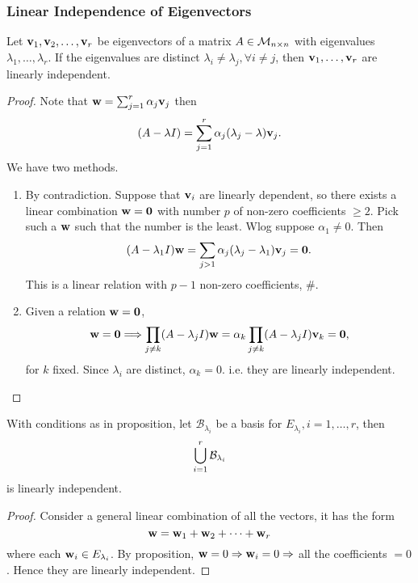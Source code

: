 \documentclass[10pt]{article}
\def\ge{\geqslant}
\begin{document}
    \subsubsection{Linear Independence of Eigenvectors}
    \begin{proposition}\label{prop:eigenvectors linearly independent}
        Let $ {\bf v}_1,{\bf v}_2,\dots, {\bf v}_r $ be eigenvectors of a matrix $A\in {\mathcal{M}}_{n\times n}$ with eigenvalues $ \lambda_1,\dots,\lambda_r $. If the eigenvalues are distinct $ \lambda_i\neq \lambda_j, \forall i\neq j $, then $ {\bf v}_1,\dots,{\bf v}_r $ are linearly independent.
    \end{proposition}
    \begin{proof}
        Note that $ {\bf w}=\sum_{j=1}^{r} \alpha_j {\bf v}_j $ then 
        \[
            (A-\lambda I)=\sum_{j=1}^{r} \alpha_j(\lambda_j-\lambda){\bf v}_j
        .\]
        We have two methods.
        \begin{enumerate}[align=hang,label=Method \arabic*.]
            \item By contradiction. Suppose that ${\bf v}_i$ are linearly dependent, so there exists a linear combination $ {\bf w}= \mathbf{0} $ with number $p$ of non-zero coefficients $ \ge 2 $. Pick such a ${\bf w}$ such that the number is the least. Wlog suppose $ \alpha_1 \neq 0$. Then 
            \[
                (A-\lambda_1 I){\bf w}= \sum_{j>1}\alpha_j(\lambda_j-\lambda_1 ){\bf v}_j=\mathbf{0}
            .\]
            This is a linear relation with $p-1$ non-zero coefficients, \#.
            \item Given a relation $ {\bf w}=\mathbf{0} $, 
            \[
                {\bf w}=\mathbf{0} \Longrightarrow \prod_{j\neq k}(A-\lambda_j I){\bf w}=\alpha_k\prod_{j\neq k}(A-\lambda_j I) {\bf v}_k=\mathbf{0}
            ,\]
            for $k$ fixed. Since $ \lambda_i $ are distinct, $ \alpha_k=0 $. i.e. they are linearly independent.
        \end{enumerate}
    \end{proof}
    \begin{corollary}\label{col:basis of all eigenvectors}
            With conditions as in proposition, let $ \mathcal{B}_{\lambda_i} $ be a basis for $ E_{\lambda_i},i=1,\dots,r $, then 
            \[
                \bigcup_{i=1}^{r} {\mathcal{B}}_{\lambda_i}
            \]
            is linearly independent.
    \end{corollary}
    \begin{proof}
        Consider a general linear combination of all the vectors, it has the form 
        \[
            {\bf w}={\bf w}_1+{\bf w}_2+ \cdots +{\bf w}_r
        \]
        where each ${\bf w}_i\in E_{\lambda_i}$. By proposition, $ {\bf w}=0 \Rightarrow {\bf w}_i=0 \Rightarrow  $ all the coefficients $=0$. Hence they are linearly independent.
    \end{proof}
\end{document}
